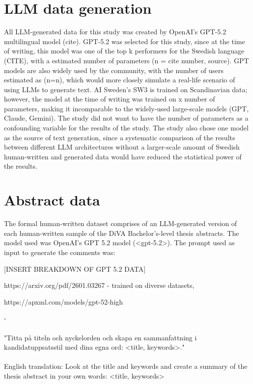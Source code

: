 \documentclass[thesis]{cluu}
\begin{document}
\section{LLM data generation}

All LLM-generated data for this study was created by OpenAI's GPT-5.2 multilingual model (cite). GPT-5.2 was selected for this study, since at the time of writing, this model was one of the top k performers for the Swedish language (CITE), with a estimated number of parameters (n = cite number, source). GPT models are also widely used by the community, with the number of users estimated as (n=n), which would more closely simulate a real-life scenario of using LLMs to generate text.  AI Sweden's SW3 is trained on Scandinavian data; however, the model at the time of writing was trained on x number of parameters, making it incomparable to the widely-used large-scale models (GPT, Claude, Gemini). The study did not want to have the number of parameters as a confounding variable for the results of the study. The study also chose one model as the source of text generation, since a systematic comparison of the results between different LLM architectures without a larger-scale amount of Swedish human-written and generated data would have reduced the statistical power of the results.

\section{Abstract data}

The formal human-written dataset comprises of an LLM-generated
version of each human-written sample of the DiVA
Bachelor's-level thesis abstracts. The model used was OpenAI's
GPT 5.2 model (<gpt-5.2>). The prompt used as input to generate
the comments was:

[INSERT BREAKDOWN OF GPT 5.2 DATA]

https://arxiv.org/pdf/2601.03267
- trained on diverse datasets, 

https://apxml.com/models/gpt-52-high

- 
\paragraph{}
"Titta på titeln och nyckelorden och skapa en sammanfattning i
kandidatuppsatsstil med dina egna ord: <title, keywords>."
\paragraph{}
English translation: Look at the title and keywords and create a
summary of the thesis abstract in your own words: <title,
keywords>
\end{document}
